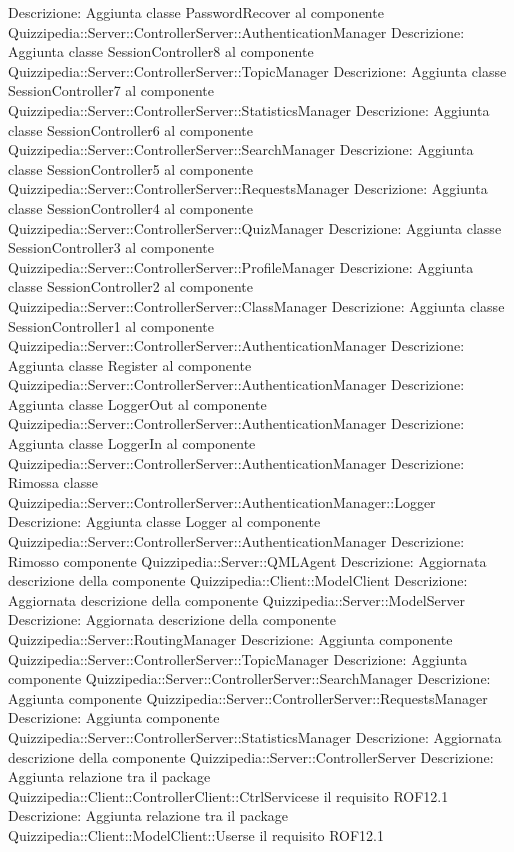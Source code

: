 Descrizione: Aggiunta classe PasswordRecover al componente Quizzipedia::Server::ControllerServer::AuthenticationManager 
Descrizione: Aggiunta classe SessionController8 al componente Quizzipedia::Server::ControllerServer::TopicManager 
Descrizione: Aggiunta classe SessionController7 al componente Quizzipedia::Server::ControllerServer::StatisticsManager 
Descrizione: Aggiunta classe SessionController6 al componente Quizzipedia::Server::ControllerServer::SearchManager 
Descrizione: Aggiunta classe SessionController5 al componente Quizzipedia::Server::ControllerServer::RequestsManager 
Descrizione: Aggiunta classe SessionController4 al componente Quizzipedia::Server::ControllerServer::QuizManager 
Descrizione: Aggiunta classe SessionController3 al componente Quizzipedia::Server::ControllerServer::ProfileManager 
Descrizione: Aggiunta classe SessionController2 al componente Quizzipedia::Server::ControllerServer::ClassManager 
Descrizione: Aggiunta classe SessionController1 al componente Quizzipedia::Server::ControllerServer::AuthenticationManager 
Descrizione: Aggiunta classe Register al componente Quizzipedia::Server::ControllerServer::AuthenticationManager 
Descrizione: Aggiunta classe LoggerOut al componente Quizzipedia::Server::ControllerServer::AuthenticationManager 
Descrizione: Aggiunta classe LoggerIn al componente Quizzipedia::Server::ControllerServer::AuthenticationManager 
Descrizione: Rimossa classe Quizzipedia::Server::ControllerServer::AuthenticationManager::Logger 
Descrizione: Aggiunta classe Logger al componente Quizzipedia::Server::ControllerServer::AuthenticationManager 
Descrizione: Rimosso componente Quizzipedia::Server::QMLAgent 
Descrizione: Aggiornata descrizione della componente Quizzipedia::Client::ModelClient 
Descrizione: Aggiornata descrizione della componente Quizzipedia::Server::ModelServer 
Descrizione: Aggiornata descrizione della componente Quizzipedia::Server::RoutingManager 
Descrizione: Aggiunta componente Quizzipedia::Server::ControllerServer::TopicManager 
Descrizione: Aggiunta componente Quizzipedia::Server::ControllerServer::SearchManager 
Descrizione: Aggiunta componente Quizzipedia::Server::ControllerServer::RequestsManager 
Descrizione: Aggiunta componente Quizzipedia::Server::ControllerServer::StatisticsManager 
Descrizione: Aggiornata descrizione della componente Quizzipedia::Server::ControllerServer 
Descrizione: Aggiunta relazione tra il package Quizzipedia::Client::ControllerClient::CtrlServicese il requisito ROF12.1 
Descrizione: Aggiunta relazione tra il package Quizzipedia::Client::ModelClient::Userse il requisito ROF12.1 
